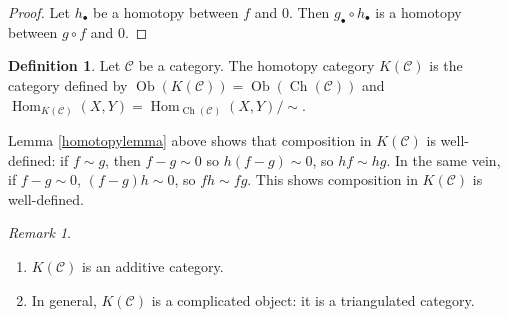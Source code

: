 \documentclass{article}
\newcommand{\cat}{\mathcal{C}}
\DeclareMathOperator{\Ch}{Ch}
\DeclareMathOperator{\Ob}{Ob}
\DeclareMathOperator{\Hom}{Hom}
\newcommand{\warning}{\faExclamationTriangle \hspace{3pt}}
\theoremstyle{plain}
\theoremstyle{definition}
\newtheorem{definition}[theorem]{Definition}
\theoremstyle{remark}
\newtheorem*{remark}{Remark}
\begin{document}
\begin{proof}
    Let $h_\bullet$ be a homotopy between $f$ and $0$. Then $g_\bullet \circ h_\bullet$ is a homotopy between $g\circ f$ and $0$.
\end{proof}

\begin{definition}
    Let $\cat$ be a category. The homotopy category $K(\cat)$ is the category defined by $\Ob(K(\cat)) = \Ob(\Ch(\cat))$ and $\Hom_{K(\cat)} (X,Y) = \Hom_{\Ch(\cat)}(X,Y)/\sim$.
\end{definition}

Lemma \ref{homotopylemma} above shows that composition in $K(\cat)$ is well-defined: if $f \sim g$, then $f-g \sim 0$ so $h(f-g) \sim 0$, so $hf \sim hg$. In the same vein, if $f - g \sim 0$, $(f-g)h \sim 0$, so $fh \sim fg$. This shows composition in $K(\cat)$ is well-defined.

\begin{remark}\leavevmode
    \begin{enumerate}
        \item $K(\cat)$ is an additive category.
        \item \warning In general, $K(\cat)$ is a complicated object: it is a triangulated category.
    \end{enumerate}
\end{remark}
\end{document}
